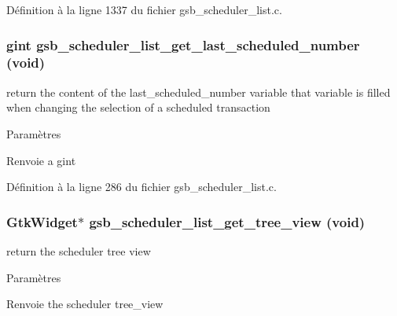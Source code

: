 Définition à la ligne 1337 du fichier gsb\_\-scheduler\_\-list.c.

\subsubsection[{gsb\_\-scheduler\_\-list\_\-get\_\-last\_\-scheduled\_\-number}]{\setlength{\rightskip}{0pt plus 5cm}gint gsb\_\-scheduler\_\-list\_\-get\_\-last\_\-scheduled\_\-number (void)}\label{gsb__scheduler__list_8c_ae3d3fe09b37dc577b1b3f4564da0572a}
return the content of the last\_\-scheduled\_\-number variable that variable is filled when changing the selection of a scheduled transaction


\begin{DoxyParams}{Paramètres}
\item[{\em }]\end{DoxyParams}
\begin{DoxyReturn}{Renvoie}
a gint 
\end{DoxyReturn}


Définition à la ligne 286 du fichier gsb\_\-scheduler\_\-list.c.

\subsubsection[{gsb\_\-scheduler\_\-list\_\-get\_\-tree\_\-view}]{\setlength{\rightskip}{0pt plus 5cm}GtkWidget$\ast$ gsb\_\-scheduler\_\-list\_\-get\_\-tree\_\-view (void)}\label{gsb__scheduler__list_8c_a672312ea4cd0c1237b5a8312c330aaef}
return the scheduler tree view


\begin{DoxyParams}{Paramètres}
\item[{\em }]\end{DoxyParams}
\begin{DoxyReturn}{Renvoie}
the scheduler tree\_\-view 
\end{DoxyReturn}


